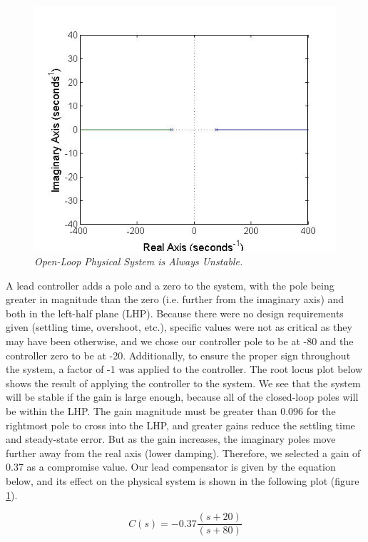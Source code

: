 \documentclass{article}
\theoremstyle{plain}
\theoremstyle{definition}
\theoremstyle{remark}
\begin{document}
\begin{figure}[h!]
\begin{center}
\includegraphics[width = 12cm]{FigureA}
\caption{\emph{Open-Loop Physical System is Always Unstable.}}
\label{Q2}
\end{center}
\end{figure}

A lead controller adds a pole and a zero to the system, with the pole being greater in magnitude than the zero (i.e. further from the imaginary axis) and both in the left-half plane (LHP). Because there were no design requirements given (settling time, overshoot, etc.), specific values were not as critical as they may have been otherwise, and we chose our controller pole to be at -80 and the controller zero to be at -20. Additionally, to ensure the proper sign throughout the system, a factor of -1 was applied to the controller. The root locus plot below shows the result of applying the controller to the system. We see that the system will be stable if the gain is large enough, because all of the closed-loop poles will be within the LHP. The gain magnitude must be greater than 0.096 for the rightmost pole to cross into the LHP, and greater gains reduce the settling time and steady-state error. But as the gain increases, the imaginary poles move further away from the real axis (lower damping). Therefore, we selected a gain of 0.37 as a compromise value. Our lead compensator is given by the equation below, and its effect on the physical system is shown in the following plot (figure \ref{Q2}). 

$$C(s)= -0.37 \frac{(s+20)}{(s+80)}$$
\end{document}
